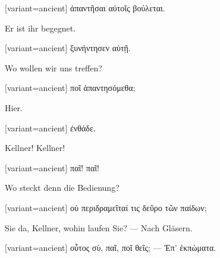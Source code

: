 \begin{greek}[variant=ancient]%
ἀπαντῆσαι αὐτοῖς βούλεται.

\end{greek}%
\switchcolumn*

Er ist ihr begegnet.

\switchcolumn

\begin{greek}[variant=ancient]%
ξυνήντησεν αὐτῇ.

\end{greek}%
\switchcolumn*

Wo wollen wir uns treffen?

\switchcolumn

\begin{greek}[variant=ancient]%
ποῖ ἀπαντησόμεθα;

\end{greek}%
\switchcolumn*

Hier.

\switchcolumn

\begin{greek}[variant=ancient]%
ἐνθάδε.

\end{greek}%
\indent Kellner! Kellner!

\switchcolumn

\begin{greek}[variant=ancient]%
παῖ! παῖ!

\end{greek}%
\switchcolumn*

Wo steckt denn die Bedienung?

\switchcolumn

\begin{greek}[variant=ancient]%
οὐ περιδραμεῖταί τις δεῦρο τῶν παίδων;

\end{greek}%
\switchcolumn*

Sie da, Kellner, wohin laufen Sie? --- Nach Gläsern.

\switchcolumn

\begin{greek}[variant=ancient]%
οὗτος σὺ, παῖ, ποῖ θεῖς; --- Ἐπ' ἐκπώματα.

\end{greek}%
\switchcolumn*

